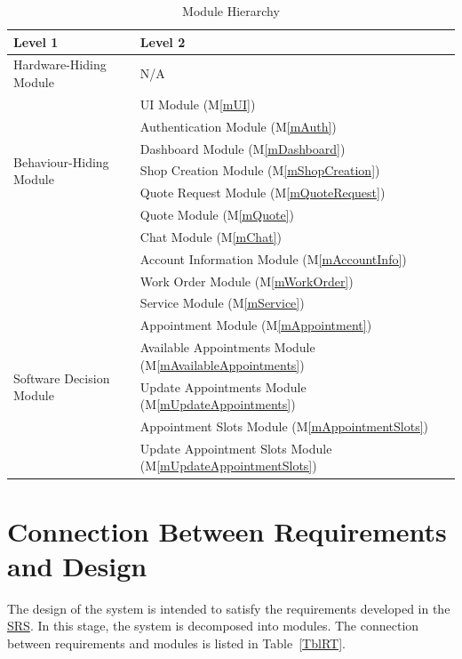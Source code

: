 \documentclass[12pt, titlepage]{article}
\newcommand{\mref}[1]{M\ref{#1}}
\begin{document}
\begin{table}[htbp]
\centering
\begin{tabular}{p{} p{}}
\toprule
\textbf{Level 1} & \textbf{Level 2}\\
\midrule

{Hardware-Hiding Module} & N/A \\
\midrule

\multirow{7}{0.3\textwidth}{Behaviour-Hiding Module}
& UI Module (\mref{mUI})\\
& Authentication Module (\mref{mAuth})\\ 
& Dashboard Module (\mref{mDashboard})\\
& Shop Creation Module (\mref{mShopCreation})\\ 
& Quote Request Module (\mref{mQuoteRequest})\\ 
& Quote Module (\mref{mQuote})\\
& Chat Module (\mref{mChat})\\ 
& Account Information Module (\mref{mAccountInfo})\\
& Work Order Module (\mref{mWorkOrder})\\
& Service Module (\mref{mService})\\
& Appointment Module (\mref{mAppointment})\\ 
\midrule

\multirow{3}{0.3\textwidth}{Software Decision Module}
& Available Appointments Module (\mref{mAvailableAppointments})\\
& Update Appointments Module (\mref{mUpdateAppointments})\\
& Appointment Slots Module (\mref{mAppointmentSlots})\\
& Update Appointment Slots Module (\mref{mUpdateAppointmentSlots})\\
\bottomrule

\end{tabular}
\caption{Module Hierarchy}
\label{TblMH}
\end{table}

\section{Connection Between Requirements and Design} \label{SecConnection}

The design of the system is intended to satisfy the requirements developed in
the \href{https://github.com/HKanwal/kapstone/blob/main/docs/SRS/SRS.pdf}{SRS}. In this stage, the system is decomposed into modules. The connection
between requirements and modules is listed in Table~\ref{TblRT}.
\end{document}
